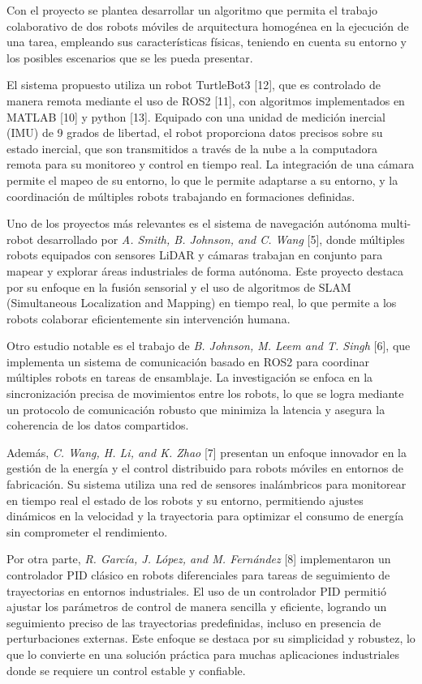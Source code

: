 \documentclass[conference]{IEEEtran}
\begin{document}
Con el proyecto se plantea desarrollar un algoritmo que permita el trabajo colaborativo de dos robots móviles de arquitectura homogénea en la ejecución de una tarea, empleando sus características físicas, teniendo en cuenta su entorno y los posibles escenarios que se les pueda presentar. 

El sistema propuesto utiliza un robot TurtleBot3 [12], que es controlado de manera remota mediante el uso de ROS2 [11], con algoritmos implementados en MATLAB [10] y python [13]. Equipado con una unidad de medición inercial (IMU) de 9 grados de libertad, el robot proporciona datos precisos sobre su estado inercial, que son transmitidos a través de la nube a la computadora remota para su monitoreo y control en tiempo real. La integración de una cámara permite el mapeo de su entorno, lo que le permite adaptarse a su entorno, y la coordinación de múltiples robots trabajando en formaciones definidas.

Uno de los proyectos más relevantes es el sistema de navegación autónoma multi-robot desarrollado por \textit{A. Smith, B. Johnson, and C. Wang} [5], donde múltiples robots equipados con sensores LiDAR y cámaras trabajan en conjunto para mapear y explorar áreas industriales de forma autónoma. Este proyecto destaca por su enfoque en la fusión sensorial y el uso de algoritmos de SLAM (Simultaneous Localization and Mapping) en tiempo real, lo que permite a los robots colaborar eficientemente sin intervención humana.

Otro estudio notable es el trabajo de \textit{B. Johnson, M. Leem and T. Singh} [6], que implementa un sistema de comunicación basado en ROS2 para coordinar múltiples robots en tareas de ensamblaje. La investigación se enfoca en la sincronización precisa de movimientos entre los robots, lo que se logra mediante un protocolo de comunicación robusto que minimiza la latencia y asegura la coherencia de los datos compartidos.

Además, \textit{C. Wang, H. Li, and K. Zhao} [7] presentan un enfoque innovador en la gestión de la energía y el control distribuido para robots móviles en entornos de fabricación. Su sistema utiliza una red de sensores inalámbricos para monitorear en tiempo real el estado de los robots y su entorno, permitiendo ajustes dinámicos en la velocidad y la trayectoria para optimizar el consumo de energía sin comprometer el rendimiento.

Por otra parte, \textit{R. García, J. López, and M. Fernández} [8] implementaron un controlador PID clásico en robots diferenciales para tareas de seguimiento de trayectorias en entornos industriales. El uso de un controlador PID permitió ajustar los parámetros de control de manera sencilla y eficiente, logrando un seguimiento preciso de las trayectorias predefinidas, incluso en presencia de perturbaciones externas. Este enfoque se destaca por su simplicidad y robustez, lo que lo convierte en una solución práctica para muchas aplicaciones industriales donde se requiere un control estable y confiable.
\end{document}
